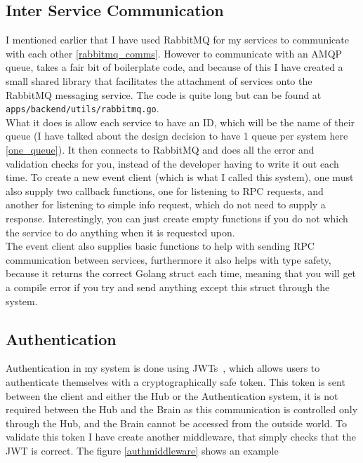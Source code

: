 \documentclass[titlepage]{article}
\begin{document}
\pagebreak

\subsection{Inter Service Communication}
I mentioned earlier that I have used RabbitMQ for my services to communicate with each other \ref{rabbitmq_comms}. However to communicate with an AMQP queue, takes a fair bit of boilerplate code, and because of this I have created a small shared library that facilitates the attachment of services onto the RabbitMQ messaging service. The code is quite long but can be found at \lstinline{apps/backend/utils/rabbitmq.go}. \\

What it does is allow each service to have an ID, which will be the name of their queue (I have talked about the design decision to have 1 queue per system here \ref{one_queue}). It then connects to RabbitMQ and does all the error and validation checks for you, instead of the developer having to write it out each time. To create a new event client (which is what I called this system), one must also supply two callback functions, one for listening to RPC requests, and another for listening to simple info request, which do not need to supply a response. Interestingly, you can just create empty functions if you do not which the service to do anything when it is requested upon. \\

The event client also supplies basic functions to help with sending RPC communication between services, furthermore it also helps with type safety, because it returns the correct Golang struct each time, meaning that you will get a compile error if you try and send anything except this struct through the system.

\pagebreak

\subsection{Authentication}
Authentication in my system is done using JWTs~\cite{jwt}, which allows users to authenticate themselves with a cryptographically safe token. This token is sent between the client and either the Hub or the Authentication system, it is not required between the Hub and the Brain as this communication is controlled only through the Hub, and the Brain cannot be accessed from the outside world. To validate this token I have create another middleware, that simply checks that the JWT is correct. The figure \ref{authmiddleware} shows an example
\end{document}
